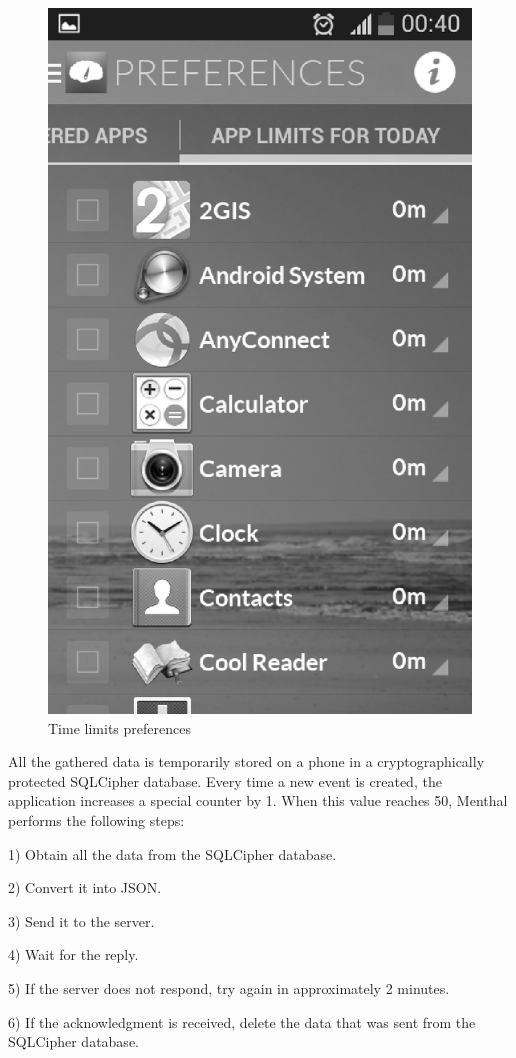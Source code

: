 \begin{figure}[h]
\begin{minipage}{.5\textwidth}
  \includegraphics [width=.8\textwidth]{images/Menthal_GUI_preferences}
  \caption{Time limits preferences}
  \label{fig:menthal_gui_preferences}
\end{minipage}
\end{figure}

All the gathered data is temporarily stored on a phone in a cryptographically protected SQLCipher database.
Every time a new event is created, the application increases a special counter by 1.
When this value reaches 50, Menthal performs the following steps:

1) Obtain all the data from the SQLCipher database.

2) Convert it into JSON.

3) Send it to the server.

4) Wait for the reply.

5) If the server does not respond, try again in approximately 2 minutes. 

6) If the acknowledgment is received, delete the data that was sent from the SQLCipher database.


